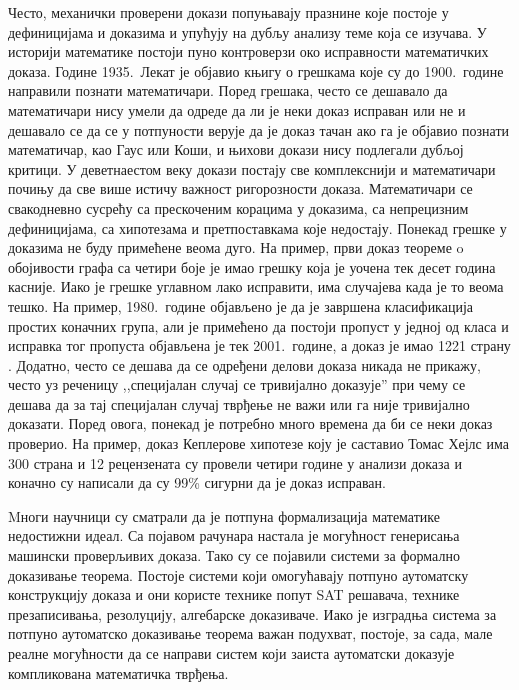 Често, механички проверени докази попуњавају празнине које постоје у
дефиницијама и доказима и упућују на дубљу анализу теме која се
изучава. У историји математике постоји пуно контроверзи око
исправности математичких доказа. Године 1935.~Лекат је објавио књигу о
грешкама које су до 1900.~године направили познати математичари. Поред
грешака, често се дешавало да математичари нису умели да одреде да ли
је неки доказ исправан или не и дешавало се да се у потпуности верује
да је доказ тачан ако га је објавио познати математичар, као Гаус или
Коши, и њихови докази нису подлегали дубљој критици. У деветнаестом
веку докази постају све комплекснији и математичари почињу да све више
истичу важност ригорозности доказа. Математичари се свакодневно
сусрећу са прескоченим корацима у доказима, са непрецизним
дефиницијама, са хипотезама и претпоставкама које недостају. Понекад
грешке у доказима не буду примећене веома дуго. На пример, први доказ
теореме o обојивости графа са четири боје је имао грешку која је
уочена тек десет година касније. Иако је грешке углавном лако
исправити, има случајева када је то веома тешко. На пример,
1980.~године објављено је да је завршена класификација простих
коначних група, али је примећено да постоји пропуст у једној од класа
и исправка тог пропуста објављена је тек 2001.~године, а доказ је имао
1221 страну \cite{aschbacher2004classification}.  Додатно, често се
дешава да се одређени делови доказа никада не прикажу, често уз
реченицу ,,специјалан случај се тривијално доказује'' при чему се
дешава да за тај специјалан случај тврђење не важи или га није
тривијално доказати. Поред овога, понекад је потребно много времена да
би се неки доказ проверио. На пример, доказ Кеплерове хипотезе коју је
саставио Томас Хејлс има 300 страна и 12 рецензената су провели четири
године у анализи доказа и коначно су написали да су 99\% сигурни да је
доказ исправан.


Mноги научници су сматрали да је потпуна формализација математике
недостижни идеал. Са појавом рачунара настала је могућност генерисања
машински проверљивих доказа. Тако су се појавили системи за формално
доказивање теорема. Постоје системи који омогућавају потпуно
ау\-то\-мат\-ску конструкцију доказа и они користе технике попут SAT
решавача, технике презаписивања, резолуцију, алгебарске
доказиваче. Иако је изградња система за потпуно аутоматско доказивање
теорема важан подухват, постоје, за сада, мале реалне могућности да се
направи систем који заиста аутоматски доказује компликована
ма\-те\-ма\-ти\-чка тврђења.


